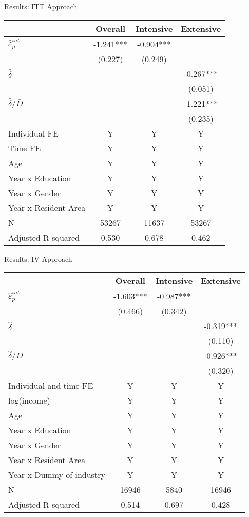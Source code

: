 \documentclass[
  ignorenonframetext,
  aspectratio=169,
]{beamer}
\begin{document}
\begin{frame}{Results: ITT Approach}
\protect\hypertarget{results-itt-approach}{}
\begin{table}
\centering\begingroup\fontsize{9}{11}\selectfont

\begin{tabular}{lccc}
\toprule
 & Overall & Intensive & Extensive\\
\midrule
$\hat{\varepsilon}_p^{int}$ & -1.241*** & -0.904*** & \\
 & (0.227) & (0.249) & \\
$\hat{\delta}$ &  &  & -0.267***\\
 &  &  & (0.051)\\
$\hat{\delta}/\bar{D}$ &  &  & -1.221***\\
 &  &  & (0.235)\\
Individual FE & Y & Y & Y\\
Time FE & Y & Y & Y\\
Age & Y & Y & Y\\
Year x Education & Y & Y & Y\\
Year x Gender & Y & Y & Y\\
Year x Resident Area & Y & Y & Y\\
N & 53267 & 11637 & 53267\\
Adjusted R-squared & 0.530 & 0.678 & 0.462\\
\bottomrule
\end{tabular}
\endgroup{}
\end{table}
\end{frame}

\begin{frame}{Results: IV Approach}
\protect\hypertarget{results-iv-approach}{}
\begin{table}
\centering\begingroup\fontsize{9}{11}\selectfont

\begin{tabular}{lccc}
\toprule
 & Overall & Intensive & Extensive\\
\midrule
$\hat{\varepsilon}_p^{int}$ & -1.603*** & -0.987*** & \\
 & (0.466) & (0.342) & \\
$\hat{\delta}$ &  &  & -0.319***\\
 &  &  & (0.110)\\
$\hat{\delta}/\bar{D}$ &  &  & -0.926***\\
 &  &  & (0.320)\\
Individual and time FE & Y & Y & Y\\
log(income) & Y & Y & Y\\
Age & Y & Y & Y\\
Year x Education & Y & Y & Y\\
Year x Gender & Y & Y & Y\\
Year x Resident Area & Y & Y & Y\\
Year x Dummy of industry & Y & Y & Y\\
N & 16946 & 5840 & 16946\\
Adjusted R-squared & 0.514 & 0.697 & 0.428\\
\bottomrule
\end{tabular}
\endgroup{}
\end{table}
\end{frame}
\end{document}
